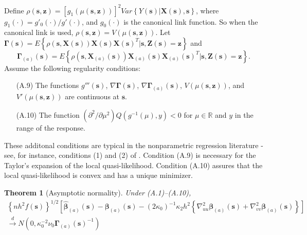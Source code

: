 \documentclass[authoryear,review, 12pt]{elsarticle}
\newtheorem{thm}{Theorem}
\begin{document}
Define $\rho(\bm{s},\bm{z})=\left[g_{1}\left(\mu(\bm{s},\bm{z})\right)\right]^{2}Var\left\{ Y(\bm{s})|\bm{X}(\bm{s}),\bm{s}\right\} $,
where $g_{1}(\cdot)=g'_{0}(\cdot)/g'(\cdot)$, and $g_{0}(\cdot)$
is the canonical link function. So when the canonical link is used,
$\rho(\bm{s},\bm{z})=V\left(\mu(\bm{s},\bm{z})\right)$. Let $\bm{\Gamma}\left(\bm{s}\right)=E\left\{ \rho\left(\bm{s},\bm{X}(\bm{s})\right)\bm{X}(\bm{s})\bm{X}(\bm{s})^{T}|\bm{s},\bm{Z}(\bm{s})=\bm{z}\right\} $
and 
\[
\bm{\Gamma}_{(a)}\left(\bm{s}\right)=E\left\{ \rho\left(\bm{s},\bm{X}_{(a)}(\bm{s})\right)\bm{X}_{(a)}(\bm{s})\bm{X}_{(a)}(\bm{s})^{T}|\bm{s},\bm{Z}(\bm{s})=\bm{z}\right\} .
\]
Assume the following regularity conditions:
\begin{itemize}
\item[(A.9)] The functions $g'''\left(\bm{s}\right)$, $\nabla\bm{\Gamma}\left(\bm{s}\right)$,
$\nabla\bm{\Gamma}_{(a)}\left(\bm{s}\right)$, $V\left(\mu\left(\bm{s},\bm{z}\right)\right)$,
and $V'\left(\mu\left(\bm{s},\bm{z}\right)\right)$ are continuous
at $\bm{s}$.
\item[(A.10)] The function $\left(\partial^{2}/\partial\mu^{2}\right)Q\left(g^{-1}\left(\mu\right),y\right)<0$
for $\mu\in\mathbb{R}$ and $y$ in the range of the response.
\end{itemize}
These additonal conditions are typical in the nonparametric regression
literature - see, for instance, conditions (1) and (2) of \citet{Cai-Fan-Li-2000}.
Condition (A.9) is necessary for the Taylor's expansion of the local
quasi-likelihood. Condition (A.10) assures that the local quasi-likelihood
is convex and has a unique minimizer.
\begin{thm}[Asymptotic normality]
\label{theorem:normality-glm}  Under (A.1)--(A.10),
\begin{gather*}
\left\{ nh^{2}f(\bm{s})\right\} ^{1/2}\left[\hat{\bm{\beta}}_{(a)}(\bm{s})-\bm{\beta}_{(a)}(\bm{s})-\left(2\kappa_{0}\right)^{-1}\kappa_{2}h^{2}\left\{ \nabla_{uu}^{2}\bm{\beta}_{\left(a\right)}(\bm{s})+\nabla_{vv}^{2}\bm{\beta}_{\left(a\right)}(\bm{s})\right\} \right]\\
\xrightarrow{d}N\left(0,\kappa_{0}^{-2}\nu_{0}\bm{\Gamma}_{(a)}(\bm{s})^{-1}\right)
\end{gather*}
\end{thm}
\end{document}
